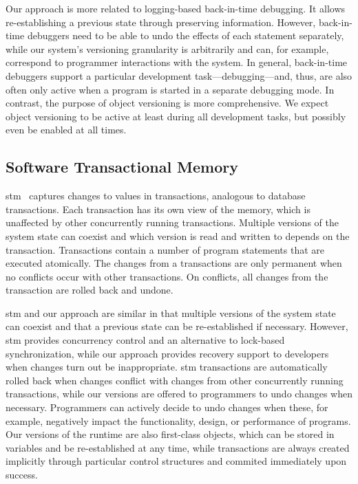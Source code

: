 Our approach is more related to logging-based back-in-time debugging.
It allows re-establishing a previous state through preserving information.
However, back-in-time debuggers need to be able to undo the effects of each statement separately, while our system's versioning granularity is arbitrarily and can, for example, correspond to programmer interactions with the system.
In general, back-in-time debuggers support a particular development task---debugging---and, thus, are also often only active when a program is started in a separate debugging mode.
In contrast, the purpose of object versioning is more comprehensive.
We expect object versioning to be active at least during all development tasks, but possibly even be enabled at all times.


\subsection{Software Transactional Memory}

\ac{stm}~\cite{Shavit1995STM} captures changes to values in transactions, analogous to database transactions.
Each transaction has its own view of the memory, which is unaffected by other concurrently running transactions.
Multiple versions of the system state can coexist and which version is read and written to depends on the transaction.
Transactions contain a number of program statements that are executed atomically.
The changes from a transactions are only permanent when no conflicts occur with other transactions.
On conflicts, all changes from the transaction are rolled back and undone.

\ac{stm} and our approach are similar in that multiple versions of the system state can coexist and that a previous state can be re-established if necessary.
However, \ac{stm} provides concurrency control and an alternative to lock-based synchronization, while our approach provides recovery support to developers when changes turn out be inappropriate.
\ac{stm} transactions are automatically rolled back when changes conflict with changes from other concurrently running transactions, while our versions are offered to programmers to undo changes when necessary.
Programmers can actively decide to undo changes when these, for example, negatively impact the functionality, design, or performance of programs. 
Our versions of the runtime are also first-class objects, which can be stored in variables and be re-established at any time, while transactions are always created implicitly through particular control structures and commited immediately upon success.



